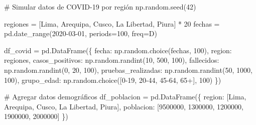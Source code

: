 \documentclass[
  doc,
  floatsintext,
  longtable,
  a4paper,
  nolmodern,
  notxfonts,
  notimes,
  12pt,
  colorlinks=true,linkcolor=blue,citecolor=blue,urlcolor=blue]{apa7}
\newenvironment{Shaded}{\begin{snugshade}}{\end{snugshade}}
\newcommand{\CommentTok}[1]{\textcolor[rgb]{0.37,0.37,0.37}{#1}}
\newcommand{\DecValTok}[1]{\textcolor[rgb]{0.68,0.00,0.00}{#1}}
\newcommand{\NormalTok}[1]{\textcolor[rgb]{0.00,0.23,0.31}{#1}}
\newcommand{\OperatorTok}[1]{\textcolor[rgb]{0.37,0.37,0.37}{#1}}
\newcommand{\StringTok}[1]{\textcolor[rgb]{0.13,0.47,0.30}{#1}}
\begin{document}
\begin{Shaded}
\begin{Highlighting}[]
\CommentTok{\# Simular datos de COVID{-}19 por región}
\NormalTok{np.random.seed(}\DecValTok{42}\NormalTok{)}

\NormalTok{regiones }\OperatorTok{=}\NormalTok{ [}\StringTok{\textquotesingle{}Lima\textquotesingle{}}\NormalTok{, }\StringTok{\textquotesingle{}Arequipa\textquotesingle{}}\NormalTok{, }\StringTok{\textquotesingle{}Cusco\textquotesingle{}}\NormalTok{, }\StringTok{\textquotesingle{}La Libertad\textquotesingle{}}\NormalTok{, }\StringTok{\textquotesingle{}Piura\textquotesingle{}}\NormalTok{] }\OperatorTok{*} \DecValTok{20}
\NormalTok{fechas }\OperatorTok{=}\NormalTok{ pd.date\_range(}\StringTok{\textquotesingle{}2020{-}03{-}01\textquotesingle{}}\NormalTok{, periods}\OperatorTok{=}\DecValTok{100}\NormalTok{, freq}\OperatorTok{=}\StringTok{\textquotesingle{}D\textquotesingle{}}\NormalTok{)}

\NormalTok{df\_covid }\OperatorTok{=}\NormalTok{ pd.DataFrame(\{}
    \StringTok{\textquotesingle{}fecha\textquotesingle{}}\NormalTok{: np.random.choice(fechas, }\DecValTok{100}\NormalTok{),}
    \StringTok{\textquotesingle{}region\textquotesingle{}}\NormalTok{: regiones,}
    \StringTok{\textquotesingle{}casos\_positivos\textquotesingle{}}\NormalTok{: np.random.randint(}\DecValTok{10}\NormalTok{, }\DecValTok{500}\NormalTok{, }\DecValTok{100}\NormalTok{),}
    \StringTok{\textquotesingle{}fallecidos\textquotesingle{}}\NormalTok{: np.random.randint(}\DecValTok{0}\NormalTok{, }\DecValTok{20}\NormalTok{, }\DecValTok{100}\NormalTok{),}
    \StringTok{\textquotesingle{}pruebas\_realizadas\textquotesingle{}}\NormalTok{: np.random.randint(}\DecValTok{50}\NormalTok{, }\DecValTok{1000}\NormalTok{, }\DecValTok{100}\NormalTok{),}
    \StringTok{\textquotesingle{}grupo\_edad\textquotesingle{}}\NormalTok{: np.random.choice([}\StringTok{\textquotesingle{}0{-}19\textquotesingle{}}\NormalTok{, }\StringTok{\textquotesingle{}20{-}44\textquotesingle{}}\NormalTok{, }\StringTok{\textquotesingle{}45{-}64\textquotesingle{}}\NormalTok{, }\StringTok{\textquotesingle{}65+\textquotesingle{}}\NormalTok{], }\DecValTok{100}\NormalTok{)}
\NormalTok{\})}

\CommentTok{\# Agregar datos demográficos}
\NormalTok{df\_poblacion }\OperatorTok{=}\NormalTok{ pd.DataFrame(\{}
    \StringTok{\textquotesingle{}region\textquotesingle{}}\NormalTok{: [}\StringTok{\textquotesingle{}Lima\textquotesingle{}}\NormalTok{, }\StringTok{\textquotesingle{}Arequipa\textquotesingle{}}\NormalTok{, }\StringTok{\textquotesingle{}Cusco\textquotesingle{}}\NormalTok{, }\StringTok{\textquotesingle{}La Libertad\textquotesingle{}}\NormalTok{, }\StringTok{\textquotesingle{}Piura\textquotesingle{}}\NormalTok{],}
    \StringTok{\textquotesingle{}poblacion\textquotesingle{}}\NormalTok{: [}\DecValTok{9500000}\NormalTok{, }\DecValTok{1300000}\NormalTok{, }\DecValTok{1200000}\NormalTok{, }\DecValTok{1900000}\NormalTok{, }\DecValTok{2000000}\NormalTok{]}
\NormalTok{\})}


\end{Highlighting}
\end{Shaded}
\end{document}

